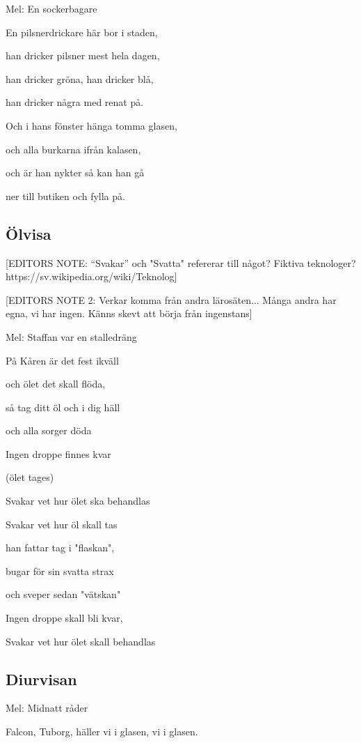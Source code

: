 Mel: En sockerbagare\bigskip


En pilsnerdrickare här bor i staden,

han dricker pilsner mest hela dagen,

han dricker gröna, han dricker blå,

han dricker några med renat på.

Och i hans fönster hänga tomma glasen,

och alla burkarna ifrån kalasen,

och är han nykter så kan han gå

ner till butiken och fylla på.

\subsection{\textbf{Ölvisa}}

[EDITORS NOTE: “Svakar” och "Svatta" refererar till något? Fiktiva teknologer? https://sv.wikipedia.org/wiki/Teknolog]

[EDITORS NOTE 2: Verkar komma från andra lärosäten... Många andra har egna, vi har ingen. Känns skevt att börja från ingenstans]

Mel: Staffan var en stalledräng\bigskip


På Kåren är det fest ikväll

och ölet det skall flöda,

så tag ditt öl och i dig häll

och alla sorger döda

Ingen droppe finnes kvar

(ölet tages)

Svakar vet hur ölet ska behandlas\bigskip

Svakar vet hur öl skall tas

han fattar tag i "flaskan",

bugar för sin svatta strax

och sveper sedan "vätskan"

Ingen droppe skall bli kvar,

Svakar vet hur ölet skall behandlas\bigskip

\subsection{\textbf{Diurvisan}}

Mel: Midnatt råder\bigskip

Falcon, Tuborg, häller vi i glasen, vi i glasen.

